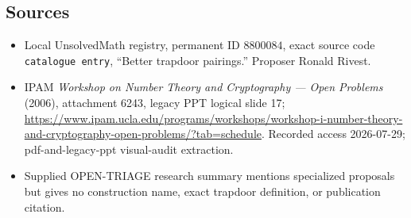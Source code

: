 \documentclass[11pt]{article}
\begin{document}
\subsection{Sources}
\begin{itemize}
\item Local UnsolvedMath registry, permanent ID \(8800084\), exact source code \texttt{catalogue entry}, ``Better trapdoor pairings.'' Proposer Ronald Rivest.
\item IPAM \emph{Workshop on Number Theory and Cryptography --- Open Problems} (2006), attachment 6243, legacy PPT logical slide 17; \url{https://www.ipam.ucla.edu/programs/workshops/workshop-i-number-theory-and-cryptography-open-problems/?tab=schedule}. Recorded access 2026-07-29; pdf-and-legacy-ppt visual-audit extraction.
\item Supplied OPEN-TRIAGE research summary mentions specialized proposals but gives no construction name, exact trapdoor definition, or publication citation.
\end{itemize}
\end{document}
